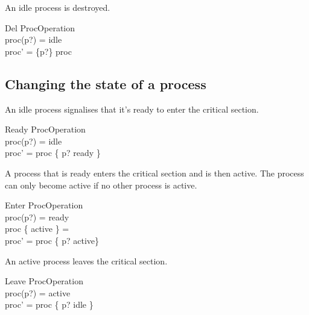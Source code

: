 \documentclass[a4paper]{article}
\begin{document}
An idle process is destroyed.
\begin{schema}{Del}
  ProcOperation\\
  \where
  proc(p?) = idle\\
  proc' = \{p?\} \ndres proc
\end{schema}


\subsection*{Changing the state of a process}

An idle process signalises that it's ready to enter the critical section.
\begin{schema}{Ready}
  ProcOperation\\
  \where
  proc(p?) = idle\\
  proc' = proc \oplus \{ p? \mapsto ready \}
\end{schema}

A process that is ready enters the critical section and is then active.
The process can only become active if no other process is active.
\begin{schema}{Enter}
  ProcOperation\\
  \where
  proc(p?) = ready\\
  proc \rres \{ active \} = \emptyset\\
  proc' = proc \oplus \{ p? \mapsto active\}
\end{schema}

An active process leaves the critical section.
\begin{schema}{Leave}
  ProcOperation\\
  \where
  proc(p?) = active\\
  proc' = proc \oplus \{ p? \mapsto idle \}
\end{schema}
\end{document}
